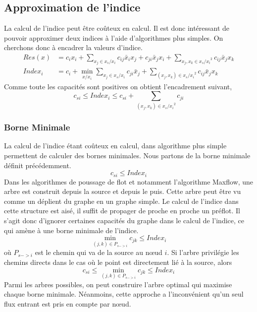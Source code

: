 \documentclass[../main/These_Mathias_Paget.tex]{subfiles}
\begin{document}
\subsection{Approximation de l'indice}

La calcul de l'indice peut être coûteux en calcul. Il est donc intéressant de pouvoir approximer deux indices à l'aide d'algorithmes plus simples. On cherchons donc à encadrer la valeurs d'indice. 
\begin{equation}
\begin{aligned}
Res(x) &= c_ix_i + \sum_{x_j \in x_s / x_i} c_{ij}\bar{x}_ix_j + c_{ji}\bar{x}_jx_i + \sum_{x_j,x_k \in {x_s/x_i}^2}{ c_{ij}\bar{x}_jx_k} \\
Index_i &= c_i + \min_{x / x_i} \sum_{x_j \in x_s / x_i} c_{ji}\bar{x}_j +  \sum_{(x_j,x_k) \in {x_s/x_i}^2}{ c_{ij}\bar{x}_jx_k}
\end{aligned}
\end{equation}
Comme toute les capacités sont positives on obtient l'encadrement suivant,
\begin{equation}
c_{si} \leq Index_i \leq  c_{si} + \sum_{(x_j,x_k) \in {x_s/x_i}^2}{c_{ji}}
\end{equation}

\subsubsection{Borne Minimale}

La calcul de l'indice étant coûteux en calcul, dans algorithme plus simple permettent de calculer des bornes minimales. Nous partons de la borne minimale définit précédemment.
\begin{equation}
c_{si} \leq Index_i
\end{equation}
Dans les algorithmes de poussage de flot et notamment l'algorithme Maxflow, une arbre est construit depuis la source et depuis le puis. Cette arbre peut être vu comme un déplient du graphe en un graphe simple. Le calcul de l'indice dans cette structure est aisé, il suffit de propager de proche en proche un préflot. Il s'agit donc d’ignorer certaines capacités du graphe dans le calcul de l'indice, ce qui amène à une borne minimale de l'indice.
\begin{equation}
\min_{(j,k) \in P_{s->i}}{c_{jk}} \leq Index_i
\end{equation}
où $P_{s->i}$ est le chemin qui va de la source au nœud $i$. Si l'arbre privilégie les chemins directs dans le cas où le point est directement lié à la source, alors
\begin{equation}
c_{si} \leq \min_{(j,k) \in P_{s->i}}{c_{jk}} \leq Index_i
\end{equation}
Parmi les arbres possibles, on peut construire l'arbre optimal qui maximise chaque borne minimale. Néanmoins, cette approche a l'inconvénient qu'un seul flux entrant est pris en compte par nœud.
\end{document}
